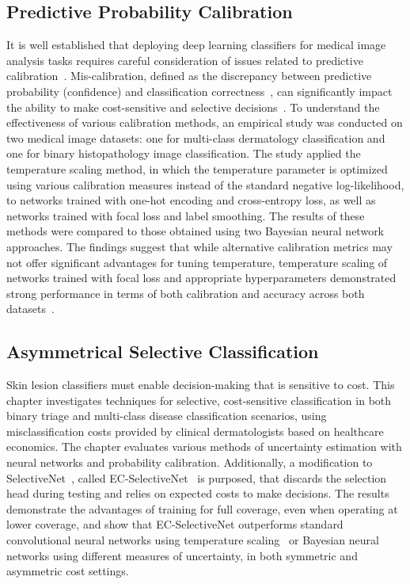 \subsection*{Predictive Probability Calibration}
It is well established that deploying deep learning classifiers for medical image analysis tasks requires careful consideration of issues related to predictive calibration~\citep{maron2019systematic}. Mis-calibration, defined as the discrepancy between predictive probability (confidence) and classification correctness~\citep{guo2017calibration}, can significantly impact the ability to make cost-sensitive and selective decisions~\citep{carse2021robust}. To understand the effectiveness of various calibration methods, an empirical study was conducted on two medical image datasets: one for multi-class dermatology classification and one for binary histopathology image classification. The study applied the temperature scaling method, in which the temperature parameter is optimized using various calibration measures instead of the standard negative log-likelihood, to networks trained with one-hot encoding and cross-entropy loss, as well as networks trained with focal loss and label smoothing. The results of these methods were compared to those obtained using two Bayesian neural network approaches. The findings suggest that while alternative calibration metrics may not offer significant advantages for tuning temperature, temperature scaling of networks trained with focal loss and appropriate hyperparameters demonstrated strong performance in terms of both calibration and accuracy across both datasets~\citep{carse2022calibration}.

\subsection*{Asymmetrical Selective Classification}
Skin lesion classifiers must enable decision-making that is sensitive to cost. This chapter investigates techniques for selective, cost-sensitive classification in both binary triage and multi-class disease classification scenarios, using misclassification costs provided by clinical dermatologists based on healthcare economics. The chapter evaluates various methods of uncertainty estimation with neural networks and probability calibration. Additionally, a modification to SelectiveNet~\citep{selective2019geifman}, called EC-SelectiveNet~\citep{carse2021robust} is purposed, that discards the selection head during testing and relies on expected costs to make decisions. The results demonstrate the advantages of training for full coverage, even when operating at lower coverage, and show that EC-SelectiveNet outperforms standard convolutional neural networks using temperature scaling~\citep{guo2017calibration} or Bayesian neural networks using different measures of uncertainty, in both symmetric and asymmetric cost settings.


